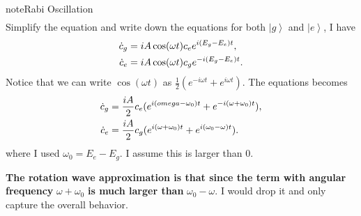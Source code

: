 \documentclass[letterpaper,12pt,english]{sphinxmanual}
\newcommand{\ket}[1]{\left| #1\right\rangle}
\begin{document}
\begin{notice}{note}{Rabi Oscillation}
\begin{gather}
\end{gather}
Simplify the equation and write down the equations for both \(\ket{g}\) and \(\ket{e}\), I have
\begin{gather}
\begin{split}\dot c_g &= i A\cos(\omega t) c_e e^{i(E_g-E_e) t}, \\
\dot c_e & = i A\cos(\omega t) c_g e^{-i(E_g-E_e)t}.\end{split}\notag
\end{gather}
Notice that we can write \(\cos(\omega t)\) as \(\frac{1}{2}(e^{-i\omega t} + e^{i\omega t})\). The equations becomes
\begin{gather}
\begin{split}\dot c_g &= \frac{iA}{2}c_e ( e^{i(omega-\omega_0)t} + e^{-i(\omega+\omega_0)t} ), \\
\dot c_e & = \frac{iA}{2} c_g ( e^{i(\omega+\omega_0)t} + e^{i( \omega_0 - \omega )t} ).\end{split}\notag
\end{gather}
where I used \(\omega_0 = E_e - E_g\). I assume this is larger than 0.

\textbf{The rotation wave approximation is that since the term with angular frequency} \(\omega+\omega_0\) \textbf{is much larger than} \(\omega_0-\omega\). I would drop it and only capture the overall behavior.


\end{notice}
\end{document}
